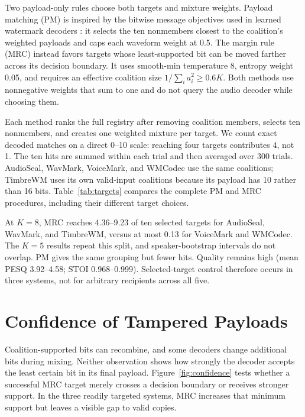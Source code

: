 \documentclass{article}
\begin{document}
Two payload-only rules choose both targets and mixture weights. Payload matching (PM) is inspired by the bitwise message objectives used in learned watermark decoders \cite{tancik2020stegastamp,luo2020distortion}: it selects the ten nonmembers closest to the coalition's weighted payloads and caps each waveform weight at 0.5. The margin rule (MRC) instead favors targets whose least-supported bit can be moved farther across its decision boundary. It uses smooth-min temperature 8, entropy weight 0.05, and requires an effective coalition size $1/\sum_i a_i^2\geq0.6K$. Both methods use nonnegative weights that sum to one and do not query the audio decoder while choosing them.

Each method ranks the full registry after removing coalition members, selects ten nonmembers, and creates one weighted mixture per target. We count exact decoded matches on a direct 0--10 scale: reaching four targets contributes 4, not 1. The ten hits are summed within each trial and then averaged over 300 trials. AudioSeal, WavMark, VoiceMark, and WMCodec use the same coalitions; TimbreWM uses its own valid-input coalitions because its payload has 10 rather than 16 bits. Table~\ref{tab:targets} compares the complete PM and MRC procedures, including their different target choices.

\begin{table}[!t]
\centering
\caption{Mean exact matches among ten selected nonmember targets (0--10).}
\label{tab:targets}
\setlength{\tabcolsep}{3.1pt}

\end{table}

At $K=8$, MRC reaches 4.36--9.23 of ten selected targets for AudioSeal, WavMark, and TimbreWM, versus at most 0.13 for VoiceMark and WMCodec. The $K=5$ results repeat this split, and speaker-bootstrap intervals do not overlap. PM gives the same grouping but fewer hits. Quality remains high (mean PESQ 3.92--4.58; STOI 0.968--0.999). Selected-target control therefore occurs in three systems, not for arbitrary recipients across all five.

\section{Confidence of Tampered Payloads}
\label{sec:confidence}

Coalition-supported bits can recombine, and some decoders change additional bits during mixing. Neither observation shows how strongly the decoder accepts the least certain bit in its final payload. Figure~\ref{fig:confidence} tests whether a successful MRC target merely crosses a decision boundary or receives stronger support. In the three readily targeted systems, MRC increases that minimum support but leaves a visible gap to valid copies.
\end{document}
